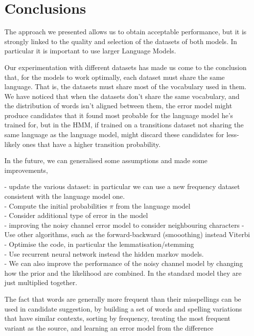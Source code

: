 \chapter{Conclusions}

The approach we presented allows us to obtain acceptable performance, but it is strongly linked to the quality 
and selection of the datasets of both models. In particular it is important to use larger Language Models.

Our experimentation with different datasets has made us come to the conclusion that, for the models to work 
optimally, each dataset must share the same language. That is, the datasets must share most of the vocabulary 
used in them. We have noticed that when the datasets don't share the same vocabulary, and the distribution of 
words isn't aligned between them, the error model might produce candidates that it found most probable for 
the language model he's trained for, but in the HMM, if trained on a transitions dataset not sharing the same 
language as the language model, might discard these candidates for less-likely ones that have a higher 
transition probability.


In the future, we can generalised some assumptions and made some improvements, 


- update the various dataset: in particular we can use a new frequency dataset consistent with the language model one.\\
- Compute the initial probabilities $\pi$ from the language model\\
- Consider additional type of error in the model\\
- improving the noisy channel error model to consider neighbouring characters
- Use other algorithms, such as the forward-backward (smooothing) instead Viterbi\\
- Optimise the code, in particular the lemmatisation/stemming \\
- Use recurrent neural network instead the hidden markov models.\\
- We can also improve the performance of the noisy channel model by changing how the prior and the likelihood 
are combined. In the standard model they are just multiplied together.

The fact that words are generally more frequent than their misspellings can be used in candidate suggestion, by 
building a set of words and spelling variations that have similar contexts, sorting by frequency, treating the most 
frequent variant as the source, and learning an error model from the difference